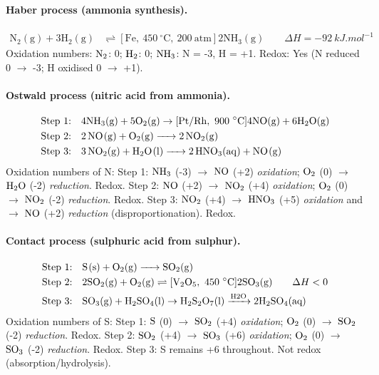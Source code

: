 \documentclass[11pt]{article}
\newcommand{\cle}[1]{{\popxbold\color{popdark}#1}}
\begin{document}
\paragraph{Haber process (ammonia synthesis).}
\begin{align*}
\ensuremath{\mathrm{N_{2}(g) + 3H_{2}(g) }}&\ensuremath{\mathrm{\rightleftharpoons [Fe,\ 450\ ^{\circ}C,\ 200\ atm] 2NH_{3}(g)}} \qquad \Delta H = -\SI{92}{kJ.mol^{-1}}
\end{align*}
Oxidation numbers: $\ce{N2}$: 0; $\ce{H2}$: 0; $\ce{NH3}$: N = -3, H = +1.
\cle{Redox}: Yes (N reduced 0 $\to$ -3; H oxidised 0 $\to$ +1).

\paragraph{Ostwald process (nitric acid from ammonia).}
\begin{align*}
\text{Step 1:}\quad & \ensuremath{\mathrm{4NH_{3}(g) + 5O_{2}(g) \rightarrow [Pt/Rh,\ 900\ ^{\circ}C] 4NO(g) + 6H_{2}O(g)}} \\
\text{Step 2:}\quad & \ce{2NO(g) + O2(g) -> 2NO2(g)} \\
\text{Step 3:}\quad & \ce{3NO2(g) + H2O(l) -> 2HNO3(aq) + NO(g)}
\end{align*}
Oxidation numbers of N:
Step 1: $\ce{NH3}$ (-3) $\to$ $\ce{NO}$ (+2) \emph{oxidation}; $\ce{O2}$ (0) $\to$ $\ce{H2O}$ (-2) \emph{reduction}. \cle{Redox}.
Step 2: $\ce{NO}$ (+2) $\to$ $\ce{NO2}$ (+4) \emph{oxidation}; $\ce{O2}$ (0) $\to$ $\ce{NO2}$ (-2) \emph{reduction}. \cle{Redox}.
Step 3: $\ce{NO2}$ (+4) $\to$ $\ce{HNO3}$ (+5) \emph{oxidation} and $\to$ $\ce{NO}$ (+2) \emph{reduction} (disproportionation). \cle{Redox}.

\paragraph{Contact process (sulphuric acid from sulphur).}
\begin{align*}
\text{Step 1:}\quad & \ce{S(s) + O2(g) -> SO2(g)} \\
\text{Step 2:}\quad & \ensuremath{\mathrm{2SO_{2}(g) + O_{2}(g) \rightleftharpoons [V_{2}O_{5},\ 450\ ^{\circ}C] 2SO_{3}(g)}} \qquad \Delta H < 0 \\
\text{Step 3:}\quad & \ensuremath{\mathrm{SO_{3}(g) + H_{2}SO_{4}(l) \rightarrow  H_{2}S_{2}O_{7}(l) \xrightarrow{H2O} 2H_{2}SO_{4}(aq)}}
\end{align*}
Oxidation numbers of S:
Step 1: $\ce{S}$ (0) $\to$ $\ce{SO2}$ (+4) \emph{oxidation}; $\ce{O2}$ (0) $\to$ $\ce{SO2}$ (-2) \emph{reduction}. \cle{Redox}.
Step 2: $\ce{SO2}$ (+4) $\to$ $\ce{SO3}$ (+6) \emph{oxidation}; $\ce{O2}$ (0) $\to$ $\ce{SO3}$ (-2) \emph{reduction}. \cle{Redox}.
Step 3: S remains +6 throughout. \cle{Not redox} (absorption/hydrolysis).
\end{document}
